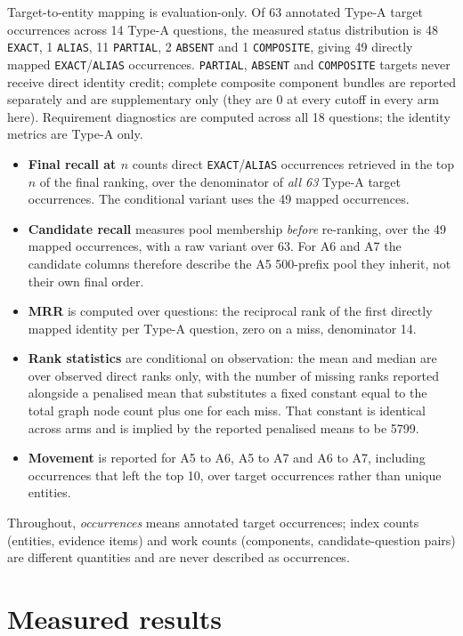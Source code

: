 \documentclass[11pt,a4paper]{article}
\begin{document}
Target-to-entity mapping is evaluation-only. Of 63 annotated Type-A target occurrences across 14 Type-A questions, the measured status distribution is 48 \texttt{EXACT}, 1 \texttt{ALIAS}, 11 \texttt{PARTIAL}, 2 \texttt{ABSENT} and 1 \texttt{COMPOSITE}, giving 49 directly mapped \texttt{EXACT}/\texttt{ALIAS} occurrences. \texttt{PARTIAL}, \texttt{ABSENT} and \texttt{COMPOSITE} targets never receive direct identity credit; complete composite component bundles are reported separately and are supplementary only (they are 0 at every cutoff in every arm here). Requirement diagnostics are computed across all 18 questions; the identity metrics are Type-A only.

\begin{itemize}
\item \textbf{Final recall at $n$} counts direct \texttt{EXACT}/\texttt{ALIAS} occurrences retrieved in the top $n$ of the final ranking, over the denominator of \emph{all 63} Type-A target occurrences. The conditional variant uses the 49 mapped occurrences.
\item \textbf{Candidate recall} measures pool membership \emph{before} re-ranking, over the 49 mapped occurrences, with a raw variant over 63. For A6 and A7 the candidate columns therefore describe the A5 500-prefix pool they inherit, not their own final order.
\item \textbf{MRR} is computed over questions: the reciprocal rank of the first directly mapped identity per Type-A question, zero on a miss, denominator 14.
\item \textbf{Rank statistics} are conditional on observation: the mean and median are over observed direct ranks only, with the number of missing ranks reported alongside a penalised mean that substitutes a fixed constant equal to the total graph node count plus one for each miss. That constant is identical across arms and is implied by the reported penalised means to be 5799.
\item \textbf{Movement} is reported for A5 to A6, A5 to A7 and A6 to A7, including occurrences that left the top 10, over target occurrences rather than unique entities.
\end{itemize}

Throughout, \emph{occurrences} means annotated target occurrences; index counts (entities, evidence items) and work counts (components, candidate-question pairs) are different quantities and are never described as occurrences.

\section{Measured results}
\label{sec:results}
\end{document}
